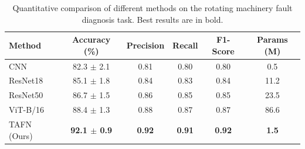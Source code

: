 \begin{table}[t]
\centering
\caption{Quantitative comparison of different methods on the rotating machinery fault diagnosis task. Best results are in bold.}
\label{tab:comparison}
\footnotesize
\begin{tabular}{lccccc}
\toprule
Method & Accuracy (\%) & Precision & Recall & F1-Score & Params (M) \\
\midrule
CNN & 82.3 $\pm$ 2.1 & 0.81 & 0.80 & 0.80 & 0.5 \\
ResNet18 & 85.1 $\pm$ 1.8 & 0.84 & 0.83 & 0.84 & 11.2 \\
ResNet50 & 86.7 $\pm$ 1.5 & 0.86 & 0.85 & 0.85 & 23.5 \\
ViT-B/16 & 88.4 $\pm$ 1.3 & 0.88 & 0.87 & 0.87 & 86.6 \\
TAFN (Ours) & \textbf{92.1 $\pm$ 0.9} & \textbf{0.92} & \textbf{0.91} & \textbf{0.92} & \textbf{1.5} \\
\bottomrule
\end{tabular}
\end{table}
